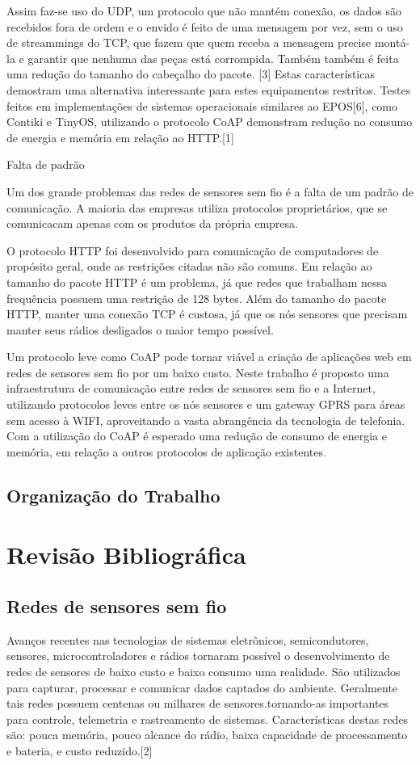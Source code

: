 Assim faz-se uso do UDP, um protocolo que não mantém conexão, os dados são recebidos fora de ordem e o envido é feito de uma mensagem por vez, sem o uso de streammings do TCP, que fazem que quem receba a mensagem precise montá-la e garantir que nenhuma das peças está corrompida. Também também é feita uma redução do tamanho do cabeçalho do pacote. [3] Estas características demostram uma alternativa interessante para estes equipamentos restritos. Testes feitos em implementações de sistemas operacionais similares ao EPOS[6], como Contiki e TinyOS, utilizando o protocolo CoAP demonstram redução no consumo de energia e memória em relação ao HTTP.[1]

Falta de padrão

Um dos grande problemas das redes de sensores sem fio é a falta de um padrão de comunicação. A maioria das empresas utiliza protocolos proprietários, que se comunicacam apenas com os produtos da própria empresa.

O protocolo HTTP foi desenvolvido para comunicação de computadores de propósito geral, onde as restrições citadas não são comuns. Em relação ao tamanho do pacote HTTP é um problema, já que redes que trabalham nessa frequência possuem uma restrição de 128 bytes.  Além do tamanho do pacote HTTP, manter uma conexão TCP é custosa, já que os nós sensores que precisam manter seus rádios desligados o maior tempo possível.

Um protocolo leve como CoAP pode tornar viável a criação de aplicações web em redes de sensores sem fio por um baixo custo. Neste trabalho é proposto uma infraestrutura de comunicação entre redes de sensores sem fio e a Internet, utilizando protocolos leves entre os nós sensores e um gateway GPRS para áreas sem acesso à WIFI, aproveitando a vasta abrangência da tecnologia de telefonia. Com a utilização do CoAP é esperado uma redução de consumo de energia e memória, em relação a outros protocolos de aplicação existentes.

\subsection{Organização do Trabalho}

\section{Revisão Bibliográfica}

\subsection{Redes de sensores sem fio}
Avanços recentes nas tecnologias de sistemas eletrônicos, semicondutores, sensores, microcontroladores e rádios tornaram possível o desenvolvimento de redes de sensores de baixo custo e baixo consumo uma realidade. São utilizados para capturar, processar e comunicar dados captados do ambiente. Geralmente tais redes possuem centenas ou milhares de sensores.tornando-as importantes para controle, telemetria e rastreamento de sistemas. Características destas redes são: pouca memória, pouco alcance do rádio, baixa capacidade de processamento e bateria, e custo reduzido.[2]

